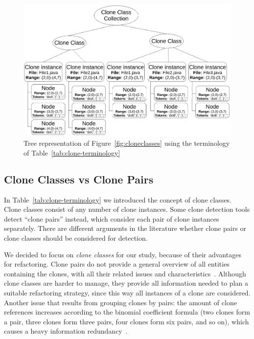 \begin{figure}[H]
  \includegraphics[width=1\columnwidth]{img/TerminologyExample}
  \caption{Tree representation of Figure~\ref{fig:cloneclasses} using the terminology of Table~\ref{tab:clone-terminology}}
  \label{fig:terminologyexample}
\end{figure}

\subsection{Clone Classes vs Clone Pairs}\label{sec:classesvspairs}
In Table~\ref{tab:clone-terminology} we introduced the concept of clone classes. Clone classes consist of any number of clone instances. Some clone detection tools detect ``clone pairs'' instead, which consider each pair of clone instances separately. There are different arguments in the literature whether clone pairs or clone classes should be considered for detection.

We decided to focus on \textit{clone classes} for our study, because of their advantages for refactoring. Clone pairs do not provide a general overview of all entities containing the clones, with all their related issues and characteristics~\cite{fontana2012duplicated}. Although clone classes are harder to manage, they provide all information needed to plan a suitable refactoring strategy, since this way all instances of a clone are considered. Another issue that results from grouping clones by pairs: the amount of clone references increases according to the binomial coefficient formula (two clones form a pair, three clones form three pairs, four clones form six pairs, and so on), which causes a heavy information redundancy~\cite{fontana2012duplicated}.

